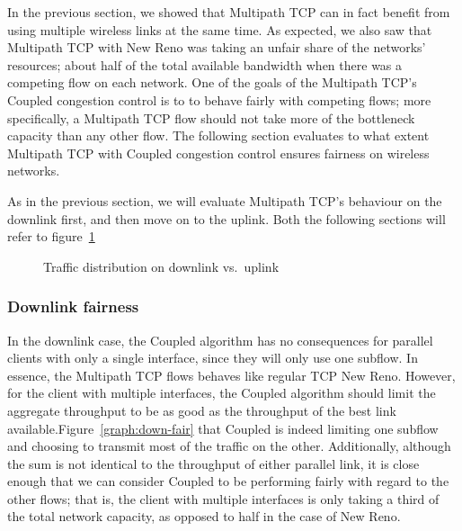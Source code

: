 In the previous section, we showed that Multipath TCP can in fact benefit from
using multiple wireless links at the same time. As expected, we also saw that Multipath TCP with New Reno was taking an unfair share of the
networks' resources; about half of the total available bandwidth when
there was a competing flow on each network. One of the goals of the Multipath TCP's Coupled congestion control is to to behave fairly with competing flows; more specifically, a Multipath TCP flow should not take more of the bottleneck capacity than any other flow. The following section evaluates to what extent Multipath TCP
with Coupled congestion control ensures fairness on wireless networks.

As in the previous section, we will evaluate Multipath TCP's behaviour on the
downlink first, and then move on to the uplink. Both the following sections will
refer to figure~\ref{graph:fairness}

\begin{figure}[h]
 \centering
 \subfloat[][downlink] {\
   \scalebox{0.55}{}\label{graph:down-fair}
 }
 \subfloat[][uplink] {\
   \scalebox{0.55}{}\label{graph:up-fair}
 }

 \caption{Traffic distribution on downlink vs.\ uplink}\label{graph:fairness}
\end{figure}

\subsubsection{Downlink fairness}
In the downlink case, the Coupled algorithm has no consequences
for parallel clients with only a single interface, since they will only use one subflow. In essence, the Multipath TCP flows behaves like regular TCP New Reno. However, for the
client with multiple interfaces, the Coupled algorithm should limit the aggregate throughput to be as good
as the throughput of the best link available.\@ Figure~\ref{graph:down-fair} that Coupled is indeed limiting one subflow and choosing to transmit most of the traffic on the other. Additionally, although the sum is not identical to the throughput of either parallel link,
it is close enough that we can consider Coupled to be performing fairly with regard to the other
flows; that is, the client with multiple interfaces is only taking a third of the total network
capacity, as opposed to half in the case of New Reno.

